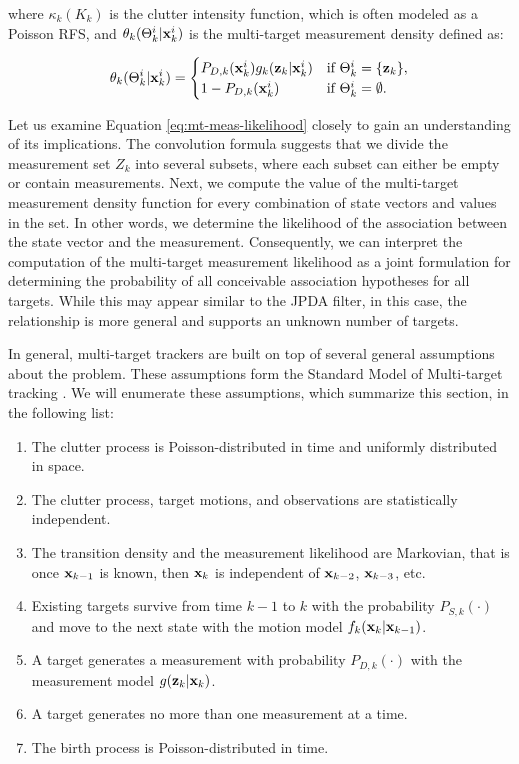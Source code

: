 \noindent where $\kappa_k(K_k)$ is the clutter intensity function, which is often modeled as a Poisson RFS, and $\theta_{k}(\Theta_{k}^i | \svecat{x}{k}{i})$ is the multi-target measurement density defined as:

\begin{equation}
    \theta_k(\Theta_{k}^i | \svecat{x}{k}{i}) = \begin{cases}
        P_{D,k}(\svecat{x}{k}{i})
            g_k(\vecat{z}{k} | \svecat{x}{k}{i}) & \text{if } \Theta_{k}^i = \{\vecat{z}{k}\}, \\
            1 - P_{D,k}(\svecat{x}{k}{i}) & \text{if } \Theta_{k}^i = \emptyset.
    \end{cases}
\end{equation}

Let us examine Equation \ref{eq:mt-meas-likelihood} closely to gain an understanding of its implications. The convolution formula suggests that we divide the measurement set $Z_k$ into several subsets, where each subset can either be empty or contain measurements. Next, we compute the value of the multi-target measurement density function for every combination of state vectors and values in the set. In other words, we determine the likelihood of the association between the state vector and the measurement. Consequently, we can interpret the computation of the multi-target measurement likelihood as a joint formulation for determining the probability of all conceivable association hypotheses for all targets. While this may appear similar to the JPDA filter, in this case, the relationship is more general and supports an unknown number of targets.

In general, multi-target trackers are built on top of several general assumptions about the problem. These assumptions form the Standard Model of Multi-target tracking \cite[311--313]{mahlerStatisticalMultisourcemultitargetInformation2007}. We will enumerate these assumptions, which summarize this section, in the following list:

\begin{enumerate}
    \item The clutter process is Poisson-distributed in time and uniformly distributed in space.
    \item The clutter process, target motions, and observations are statistically independent.
    \item The transition density and the measurement likelihood are Markovian, that is once $\vecat{x}{k-1}$ is known, then $\vecat{x}{k}$ is independent of $\vecat{x}{k-2}$, $\vecat{x}{k-3}$, etc.
    \item Existing targets survive from time $k-1$ to $k$ with the probability $P_{S,k}(\cdot)$ and move to the next state with the motion model $f_k(\vecat{x}{k} | \vecat{x}{k-1})$.
    \item A target generates a measurement with probability $P_{D,k}(\cdot)$ with the measurement model $g(\vecat{z}{k} | \vecat{x}{k})$.
    \item A target generates no more than one measurement at a time.
    \item The birth process is Poisson-distributed in time.
\end{enumerate}

